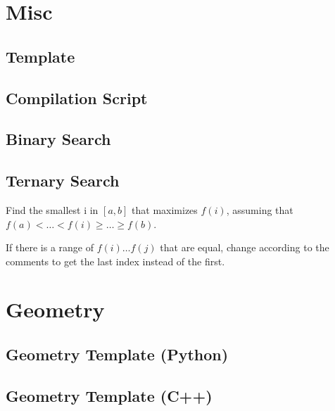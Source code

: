 \documentclass{article}
\begin{document}
\section*{Misc}

\subsection*{Template}


\subsection*{Compilation Script}


\subsection*{Binary Search}


\subsection*{Ternary Search}
Find the smallest i in $[a,b]$ that maximizes $f(i)$, assuming that $f(a) < \dots < f(i) \ge \dots \ge f(b)$.

If there is a range of $f(i) \dots f(j)$ that are equal, change according to the comments to get the last index instead of the first.

\begin{multicols}{2}
  
  \columnbreak
  
\end{multicols}

\section*{Geometry}

\subsection*{Geometry Template (Python)}


\subsection*{Geometry Template (C++)}

\end{document}

